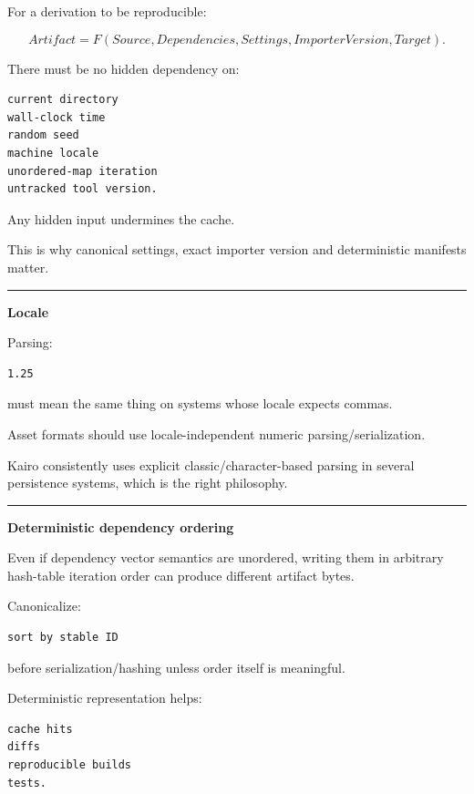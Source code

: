 For a derivation to be reproducible:

\[
Artifact
=
F(
Source,
Dependencies,
Settings,
ImporterVersion,
Target
).
\]

There must be no hidden dependency on:

\begin{verbatim}
current directory
wall-clock time
random seed
machine locale
unordered-map iteration
untracked tool version.
\end{verbatim}

Any hidden input undermines the cache.

This is why canonical settings, exact importer version and deterministic manifests matter.

\begin{center}\rule{0.5\linewidth}{0.5pt}\end{center}

\textbf{Locale}

Parsing:

\begin{verbatim}
1.25
\end{verbatim}

must mean the same thing on systems whose locale expects commas.

Asset formats should use locale-independent numeric parsing/serialization.

Kairo consistently uses explicit classic/character-based parsing in several persistence systems, which is the right philosophy.

\begin{center}\rule{0.5\linewidth}{0.5pt}\end{center}

\textbf{Deterministic dependency ordering}

Even if dependency vector semantics are unordered, writing them in arbitrary hash-table iteration order can produce different artifact bytes.

Canonicalize:

\begin{verbatim}
sort by stable ID
\end{verbatim}

before serialization/hashing unless order itself is meaningful.

Deterministic representation helps:

\begin{verbatim}
cache hits
diffs
reproducible builds
tests.
\end{verbatim}

